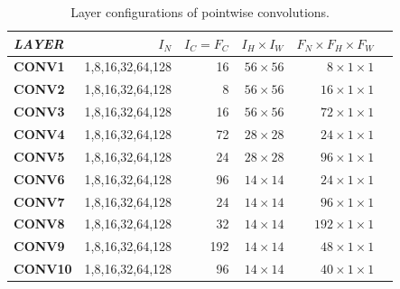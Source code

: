 \begin{table}[]
\setlength{\tabcolsep}{4.2pt}
\caption{Layer configurations of pointwise convolutions.}
\vspace{-3mm}
\label{tab:pwconv}
\begin{threeparttable}
\begin{tabular}{lrrrrr}
\toprule
\textbf{\emph{LAYER}}& \textbf{$I_N$} & \textbf{$I_C=F_C$} & \textbf{$I_H \times I_W$} & \textbf{$F_N \times F_H \times F_W$} \\
\midrule
\textbf{CONV1}  & 1,8,16,32,64,128  & 16    & $56\times 56$   & $8 \times 1\times 1$\\
\textbf{CONV2}  & 1,8,16,32,64,128  & 8     & $56\times 56$   & $16 \times 1\times 1$\\
\textbf{CONV3}  & 1,8,16,32,64,128  & 16    & $56\times 56$   & $72 \times 1\times 1$\\
\textbf{CONV4}  & 1,8,16,32,64,128  & 72    & $28\times 28$   & $24 \times 1\times 1$\\
\textbf{CONV5}  & 1,8,16,32,64,128  & 24    & $28\times 28$   & $96 \times 1\times 1$\\
\textbf{CONV6}  & 1,8,16,32,64,128  & 96    & $14\times 14$   & $24 \times 1\times 1$\\
\textbf{CONV7} & 1,8,16,32,64,128  & 24    & $14\times 14$   & $96  \times 1\times 1$\\
\textbf{CONV8} & 1,8,16,32,64,128  & 32    & $14\times 14$   & $192 \times 1\times 1$\\
\textbf{CONV9} & 1,8,16,32,64,128  & 192   & $14\times 14$   & $48  \times 1\times 1$\\
\textbf{CONV10} & 1,8,16,32,64,128  & 96    & $14\times 14$   & $40 \times 1\times 1$\\

\end{tabular}
\end{threeparttable}
\end{table}
